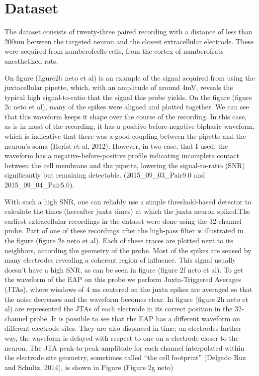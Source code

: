 \documentclass{report}
\begin{document}
\section{Dataset}
\label{sec:Netodataset}
The dataset consists of twenty-three paired recording with a distance of less than 200um between the targeted neuron and the closest extracellular electrode. These were acquired from numberofcells cells, from the cortex of numberofrats anesthetized rats.

On figure (figure2b neto et al) is an example of the signal acquired from using the juxtacellular pipette, which, with an amplitude of around 4mV, reveals the typical high signal-to-ratio that the signal this probe yields. On the figure (figure 2c neto et al), many of the spikes were aligned and  plotted together. We can see that this waveform keeps it shape over the course of the recording. In this case, as is in most of the recording, it has a positive-before-negative biphasic waveform, which is indicative that there was a good coupling between the pipette and the neuron's soma (Herfst et al, 2012). However, in two case, that I used, the waveform has a negative-before-positive profile indicating incomplete contact between the cell membrane and the pipette, lowering the signal-to-ratio (SNR) significantly but remaining detectable. (2015\_09\_03\_Pair9.0 and 2015\_09\_04\_Pair5.0).

With such a high SNR, one can reliably use a simple threshold-based detector to calculate the times (hereafter juxta times) at which the juxta neuron spiked.The earliest extracellular recordings in the dataset were done using the 32-channel probe. Part of one  of these recordings after the high-pass filter is illustrated in the figure (figure 2e neto et al).  Each of these traces are plotted next to its neighbors, according the geometry of the probe. Most of the spikes are sensed by many electrodes revealing a coherent region of influence. This signal usually doesn't have a high SNR, as can be seen in figure (figure 2f neto et al). To get the waveform of the EAP on this probe we perform Juxta-Triggered Averages (JTAs), where windows of 4 ms centered on the juxta spikes are averaged so that the noise decreases and the waveform becomes clear. In figure (figure 2h neto et al) are represented the JTAs of each electrode in its correct position in the 32-channel probe. It is possible to see that the EAP has a different waveform on different electrode sites. They are also displaced in time: on electrodes farther way, the waveform is delayed with respect to one on a electrode closer to the neuron. The JTA peak-to-peak amplitude for each channel interpolated within the electrode site geometry, sometimes called “the cell footprint” (Delgado Ruz and Schultz, 2014), is shown in Figure (Figure 2g neto)
\end{document}
